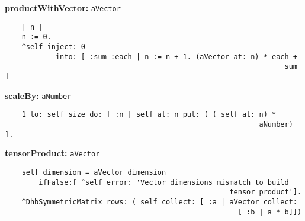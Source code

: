 {\bf productWithVector:} {\tt aVector}
\begin{verbatim}
    | n |
    n := 0.
    ^self inject: 0
            into: [ :sum :each | n := n + 1. (aVector at: n) * each + 
                                                                  sum ]
\end{verbatim}
{\bf scaleBy:} {\tt aNumber}
\begin{verbatim}
    1 to: self size do: [ :n | self at: n put: ( ( self at: n) * 
                                                            aNumber) ].
\end{verbatim}
{\bf tensorProduct:} {\tt aVector}
\begin{verbatim}
    self dimension = aVector dimension
        ifFalse:[ ^self error: 'Vector dimensions mismatch to build 
                                                     tensor product'].
    ^DhbSymmetricMatrix rows: ( self collect: [ :a | aVector collect: 
                                                       [ :b | a * b]])
\end{verbatim}

